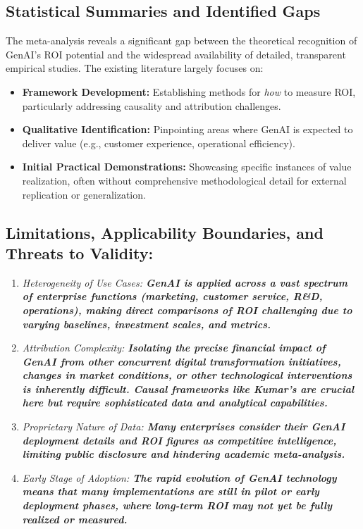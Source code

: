 \documentclass[10pt,twocolumn,letterpaper]{article}
\begin{document}
\subsection{Statistical Summaries and Identified Gaps}


The meta-analysis reveals a significant gap between the theoretical recognition of GenAI's ROI potential and the widespread availability of detailed, transparent empirical studies. The existing literature largely focuses on:
\begin{itemize}
  \item \textbf{Framework Development:} Establishing methods for \textit{how} to measure ROI, particularly addressing causality and attribution challenges.
  \item \textbf{Qualitative Identification:} Pinpointing areas where GenAI is expected to deliver value (e.g., customer experience, operational efficiency).
  \item \textbf{Initial Practical Demonstrations:} Showcasing specific instances of value realization, often without comprehensive methodological detail for external replication or generalization.
\end{itemize}


\subsection{Limitations, Applicability Boundaries, and Threats to Validity:}

\begin{enumerate}
  \item \textit{Heterogeneity of Use Cases:\textbf{ GenAI is applied across a vast spectrum of enterprise functions (marketing, customer service, R\&D, operations), making direct comparisons of ROI challenging due to varying baselines, investment scales, and metrics.}}
  \item \textit{Attribution Complexity:\textbf{ Isolating the precise financial impact of GenAI from other concurrent digital transformation initiatives, changes in market conditions, or other technological interventions is inherently difficult. Causal frameworks like Kumar's are crucial here but require sophisticated data and analytical capabilities.}}
  \item \textit{Proprietary Nature of Data:\textbf{ Many enterprises consider their GenAI deployment details and ROI figures as competitive intelligence, limiting public disclosure and hindering academic meta-analysis.}}
  \item \textit{Early Stage of Adoption:\textbf{ The rapid evolution of GenAI technology means that many implementations are still in pilot or early deployment phases, where long-term ROI may not yet be fully realized or measured.}}
\end{enumerate}
\end{document}
